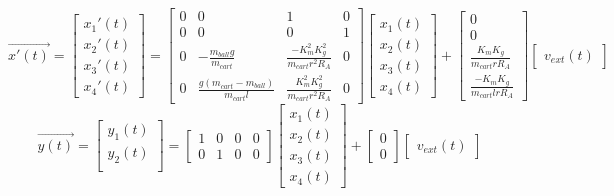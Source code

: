 \documentclass[12pt]{article} %
\begin{document}
\begin{equation} \label{eq:stateSpace}
 \vec{x'(t)} = 
\begin{bmatrix}
x_1'(t) \\
x_2'(t) \\
x_3'(t) \\
x_4'(t)
\end{bmatrix}
= 
\begin{bmatrix}
0 & 0 & 1 & 0 \\
0 & 0 & 0 & 1 \\
0 & -\frac{m_{ball}g}{m_{cart}} & \frac{-K_m^2K_g^2}{m_{cart}r^2R_A} & 0 \\
0 & \frac{g(m_{cart} - m_{ball})}{m_{cart}l} & \frac{K_m^2K_g^2}{m_{cart}r^2R_A} & 0
\end{bmatrix}
\begin{bmatrix}
x_1(t) \\
x_2(t) \\
x_3(t) \\
x_4(t)
\end{bmatrix}
+ 
\begin{bmatrix}
0 \\
0 \\
\frac{K_mK_g}{m_{cart}rR_A} \\
\frac{-K_mK_g}{m_{cart}lrR_A}
\end{bmatrix}
\begin{bmatrix}
v_{ext}(t)
\end{bmatrix}
\end{equation}
\begin{equation}
 \vec{y(t)} = 
\begin{bmatrix}
y_1(t) \\
y_2(t) \\
\end{bmatrix}
= 
\begin{bmatrix}
1 & 0 & 0 & 0 \\
0 & 1 & 0 & 0 
\end{bmatrix}
\begin{bmatrix}
x_1(t) \\
x_2(t) \\
x_3(t) \\
x_4(t)
\end{bmatrix}
+
\begin{bmatrix}
0 \\
0
\end{bmatrix}
\begin{bmatrix}
v_{ext}(t)
\end{bmatrix}
\end{equation}
\end{document}
